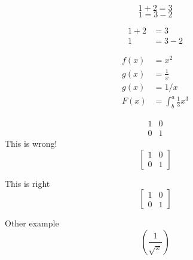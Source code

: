 \documentclass{article}
\begin{document}
\begin{equation*}
1 + 2 = 3
\end{equation*}
\begin{equation*}
1 = 3 - 2
\end{equation*}

\begin{align*}
1 + 2 &=3\\
1 &=3 - 2
\end{align*}

\begin{align*}
f(x) &= x^2 \\
g(x) &=\frac{1}{x}\\
g(x) &= 1 / x \\
F(x) &= \int^a_b \frac{1}{3}x^3
\end{align*}

$$
\begin{matrix}
  1 & 0 \\
  0 & 1
\end{matrix}
$$
This is wrong!
$$[
\begin{matrix}
1 & 0 \\
0 & 1
\end{matrix}
]$$

This is right
$$\left[
\begin{matrix}
1 & 0 \\
0 & 1
\end{matrix}
\right]$$

Other example
$$\left(\frac{1}{\sqrt{x}} \right)$$
\end{document}
